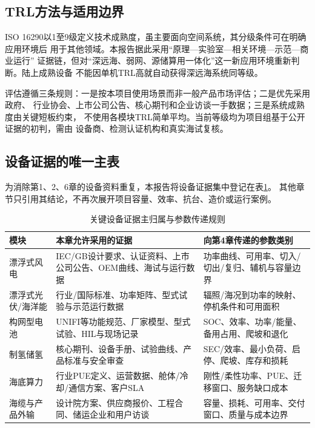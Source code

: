 \subsection{TRL方法与适用边界}

ISO 16290以1至9级定义技术成熟度，虽主要面向空间系统，其分级条件可在明确应用环境后
用于其他领域\cite{iso16290}。本报告据此采用“原理—实验室—相关环境—示范—商业运行”
证据链，但对“深远海、弱网、源储算用一体化”这一新应用环境重新判断。陆上成熟设备
不能因单机TRL高就自动获得深远海系统同等级。

评估遵循三条规则：一是按本项目使用场景而非一般产品市场评估；二是优先采用政府、
行业协会、上市公司公告、核心期刊和企业访谈一手数据；三是系统成熟度由关键短板约束，
不使用各模块TRL简单平均。当前等级均为项目组基于公开证据的初判\assumptiontag，需由
设备商、检测认证机构和真实海试复核。

\subsection{设备证据的唯一主表}

为消除第1、2、6章的设备资料重复，本报告将设备证据集中登记在表\ref{tab:c3-evidence-home}。
其他章节只引用其结论，不再次展开项目容量、效率、抗台、造价或运行案例。

\begin{table}[H]
\centering
\caption{关键设备证据主归属与参数传递规则}
\label{tab:c3-evidence-home}
\small
\begin{tabularx}{\textwidth}{p{2.5cm} >{\raggedright\arraybackslash}X >{\raggedright\arraybackslash}X}
\toprule
模块 & 本章允许采用的证据 & 向第4章传递的参数类别\\
\midrule
漂浮式风电 & IEC/GB设计要求、认证资料、上市公司公告、OEM曲线、海试与运行数据 & 功率曲线、可用率、切入/切出/复归、辅机与容量边界\\
漂浮式光伏/海洋能 & 行业/国际标准、功率矩阵、型式试验与示范运行数据 & 辐照/海况到功率的映射、停机条件和可用面积\\
构网型电池 & UNIFI等功能规范、厂家模型、型式试验、HIL与现场记录 & SOC、效率、功率/能量、备用占用、爬坡和退化\\
制氢储氢 & 核心期刊、设备手册、试验曲线、产品标准与安全审查 & SEC/效率、最小负荷、启停、爬坡、库存和损耗\\
海底算力 & 行业PUE定义、运营数据、舱体/冷却/通信方案、客户SLA & 刚性/柔性功率、PUE、迁移窗口、服务缺口成本\\
海缆与产品外输 & 设计院方案、供应商报价、工程合同、储运企业和用户访谈 & 容量、损耗、可用率、交付窗口、质量与成本边界\\
\bottomrule
\end{tabularx}

\end{table}

